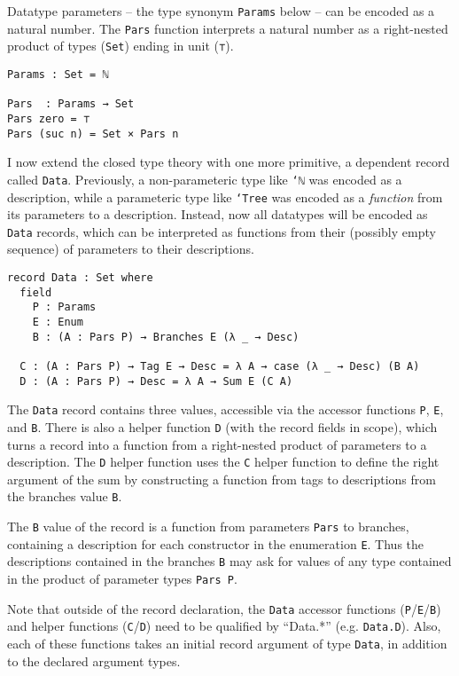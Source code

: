 \documentclass[runningheads,a4paper]{llncs}
\begin{document}
Datatype parameters -- the type synonym {\tt Params} below -- can be
encoded as a natural number. The {\tt Pars} function interprets a
natural number as a right-nested product of types ({\tt Set}) ending in
unit ({\tt ⊤}).

\begin{verbatim}
Params : Set = ℕ

Pars  : Params → Set
Pars zero = ⊤
Pars (suc n) = Set × Pars n
\end{verbatim}

I now extend the closed type theory with one more primitive, a
dependent record called {\tt Data}. Previously, a non-parameteric type like {\tt `ℕ} was
encoded as a description, while a parameteric type like
{\tt `Tree} was encoded as a {\it function} from its parameters to a
description. Instead, now all datatypes will be encoded as {\tt Data} records,
which can be interpreted as functions from their (possibly
empty sequence) of parameters to their descriptions.

\begin{verbatim}
record Data : Set where
  field
    P : Params
    E : Enum
    B : (A : Pars P) → Branches E (λ _ → Desc)

  C : (A : Pars P) → Tag E → Desc = λ A → case (λ _ → Desc) (B A)
  D : (A : Pars P) → Desc = λ A → Sum E (C A)
\end{verbatim}

The {\tt Data} record contains three values, accessible via the
accessor functions {\tt P}, {\tt E}, and {\tt B}. There is also a
helper function {\tt D} (with the record fields in scope),
which turns a record into a function from a
right-nested product of parameters to a description. The {\tt D} helper
function uses the {\tt C} helper function to define the right argument
of the sum by constructing a function from tags to descriptions from
the branches value {\tt B}.

The {\tt B} value of the record is a function from parameters
{\tt Pars} to branches, containing a description for each constructor
in the enumeration {\tt E}. 
Thus the descriptions contained in the branches {\tt B} 
may ask for values of any type contained
in the product of parameter types {\tt Pars P}.

Note that outside of the record
declaration, the {\tt Data} accessor
functions ({\tt P}/{\tt E}/{\tt B}) and helper functions
({\tt C}/{\tt D}) need to be qualified by ``Data.*''
(e.g. {\tt Data.D}). Also, each of these functions takes an
initial record argument of type {\tt Data}, in addition to the
declared argument types.
\end{document}
